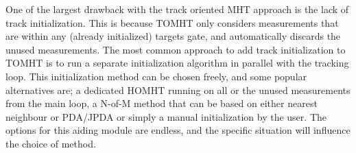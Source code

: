 One of the largest drawback with the track oriented MHT approach is the lack of track initialization. This is because TOMHT only considers measurements that are within any (already initialized) targets gate, and automatically discards the unused measurements. The most common approach to add track initialization to TOMHT is to run a separate initialization algorithm in parallel with the tracking loop. This initialization method can be chosen freely, and some popular alternatives are; a dedicated HOMHT running on all or the unused measurements from the main loop, a N-of-M method that can be based on either nearest neighbour or PDA/JPDA or simply a manual initialization by the user. The options for this aiding module are endless, and the specific situation will influence the choice of method.